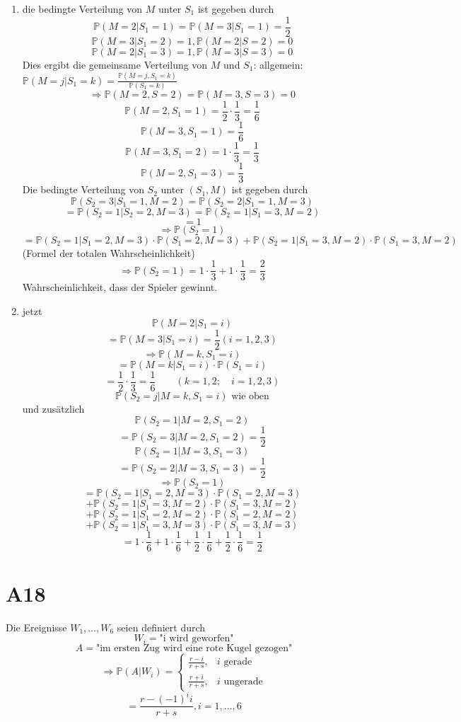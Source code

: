 \documentclass[a4paper,11pt,notitlepage]{report}
\newcommand{\Prim}{{\ensuremath{\mathbb{P}}}}
\begin{document}
\begin{enumerate}
	\item die bedingte Verteilung von $M$ unter $S_1$ ist gegeben durch
	$$\Prim(M=2 | S_1 = 1) = \Prim(M=3|S_1 = 1) = \frac{1}{2}$$
	$$\Prim(M=3 | S_1 = 2) = 1, \Prim(M=2| S=2) = 0$$
	$$\Prim(M=2 | S_1=3) = 1, \Prim(M=3| S=3)=0$$
	Dies ergibt die gemeinsame Verteilung von $M$ und $S_1$:
	allgemein: $\Prim(M=j|S_1 = k) = \frac{\Prim(M=j, S_1 = k)}{\Prim(S_1=k)}$
	$$\Rightarrow \Prim(M=2,S=2) = \Prim(M=3,S=3) = 0$$
	$$\Prim(M=2, S_1 = 1) = \frac{1}{2} \cdot \frac{1}{3} = \frac{1}{6}$$
	$$\Prim(M=3, S_1 = 1) = \frac{1}{6}$$
	$$\Prim(M=3, S_1 = 2) = 1 \cdot \frac{1}{3} = \frac{1}{3}$$
	$$\Prim(M=2, S_1 = 3) = \frac{1}{3}$$
	Die bedingte Verteilung von $S_2$ unter $(S_1,M)$ ist gegeben durch 
	$$\Prim(S_2 = 3| S_1 = 1, M=2) = \Prim(S_2 = 2| S_1 = 1, M=3)$$
	$$= \Prim(S_2 = 1 | S_2 = 2, M=3) = \Prim(S_2 = 1 | S_1 = 3, M = 2)$$
	$$= 1$$
	$$\Rightarrow \Prim(S_2 = 1)$$ $$= \Prim(S_2 = 1 | S_1 = 2, M = 3) \cdot \Prim(S_1 = 2, M= 3) + \Prim(S_2 = 1 | S_1 = 3, M = 2) \cdot \Prim(S_1 = 3, M= 2)$$
	(Formel der totalen Wahrscheinlichkeit)
	$$\Rightarrow \Prim(S_2=1) = 1 \cdot \frac{1}{3} + 1 \cdot \frac{1}{3} = \frac{2}{3}$$
	Wahrscheinlichkeit, dass der Spieler gewinnt.
	\item jetzt
		$$\Prim(M=2| S_1 = i)$$
		$$= \Prim(M=3 | S_1 = i) = \frac{1}{2} (i=1,2,3)$$
		$$\Rightarrow \Prim(M=k, S_1 = i)$$
		$$= \Prim(M=k|S_1 = i) \cdot \Prim(S_1 = i)$$
		$$= \frac{1}{2} \cdot \frac{1}{3} = \frac{1}{6} \qquad (k=1,2; \quad i = 1,2,3)$$
		$$\Prim(S_2 = j | M=k, S_1 = i) \text{ wie oben}$$
		und zusätzlich
		$$\Prim(S_2 = 1 | M= 2, S_1 = 2)$$
		$$= \Prim(S_2 = 3 | M=2, S_1 = 2) = \frac{1}{2}$$ 
		$$\Prim(S_2 = 1 | M=3, S_1 = 3)$$
		$$= \Prim(S_2 = 2 | M = 3, S_1 = 3) = \frac{1}{2}$$
		$$\Rightarrow \Prim(S_2 = 1)$$
		$$= \Prim(S_2 = 1 | S_1 = 2, M = 3) \cdot \Prim(S_1 = 2, M = 3)$$ $$+ \Prim(S_2 = 1 | S_1 = 3, M = 2) \cdot \Prim(S_1 = 3, M = 2)$$ $$+ \Prim(S_2 = 1 | S_1 = 2, M = 2) \cdot \Prim(S_1 = 2, M = 2)$$ $$+ \Prim(S_2 = 1 | S_1 = 3, M = 3) \cdot \Prim(S_1 = 3, M = 3)$$
		$$= 1 \cdot \frac{1}{6} + 1 \cdot \frac{1}{6} + \frac{1}{2} \cdot \frac{1}{6} + \frac{1}{2} \cdot \frac{1}{6} = \frac{1}{2}$$
\end{enumerate}

\section{A18}
Die Ereignisse $W_1, \ldots, W_6$ seien definiert durch
$$W_i = \text{"i wird geworfen"}$$
$$A = \text{"im ersten Zug wird eine rote Kugel gezogen"}$$
$$\Rightarrow \Prim(A | W_i) = \begin{cases} \frac{r-i}{r+s}, & i \text{ gerade} \\ \frac{r+i}{r+s}, & i \text{ ungerade} \end{cases}$$
$$= \frac{r- (-1)^i i}{r+s}, i = 1, \ldots, 6$$ 
\end{document}
